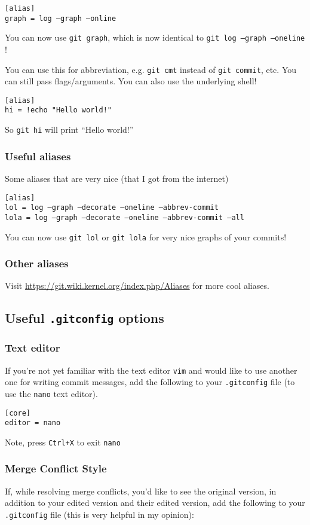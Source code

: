 \documentclass[12pt]{article}
\begin{document}
\texttt{[alias]\\
graph = log --graph --online
}

You can now use \texttt{git graph}, which is now identical to \texttt{git log --graph --oneline} ! 

You can use this for abbreviation, e.g. \texttt{git cmt} instead of \texttt{git commit}, etc. You can still pass flags/arguments. You can also use the underlying shell!

\texttt{[alias]\\
hi = !echo "Hello world!"
}

So \texttt{git hi} will print ``Hello world!''


\subsubsection{Useful aliases}
Some aliases that are very nice (that I got from the internet)

\texttt{[alias]\\
lol = log --graph --decorate --oneline --abbrev-commit\\
lola = log --graph --decorate --oneline --abbrev-commit --all\\
}

You can now use \texttt{git lol} or \texttt{git lola} for very nice graphs of your commits!

\subsubsection{Other aliases}
Visit \url{https://git.wiki.kernel.org/index.php/Aliases} for more cool aliases.
\subsection{Useful \texttt{.gitconfig} options}

\subsubsection{Text editor}
If you're not yet familiar with the text editor \texttt{vim} and would like to use another one for writing commit messages, add the following to your \texttt{.gitconfig} file (to use the \texttt{nano} text editor).

\texttt{[core]\\
editor = nano }

Note, press \texttt{Ctrl+X} to exit \texttt{nano}

\subsubsection{Merge Conflict Style}
If, while resolving merge conflicts, you'd like to see the original version, in addition to your edited version and their edited version, add the following to your \texttt{.gitconfig} file (this is very helpful in my opinion):
\end{document}
